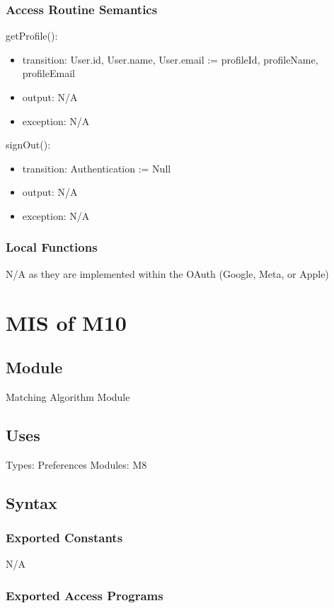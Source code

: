\documentclass[12pt, titlepage]{article}
\begin{document}
\subsubsection{Access Routine Semantics}

\noindent getProfile():
\begin{itemize}
\item transition: User.id, User.name, User.email := profileId, profileName, profileEmail
\item output: N/A
\item exception: N/A
\end{itemize}

\noindent signOut():
\begin{itemize}
\item transition: Authentication := Null
\item output: N/A
\item exception: N/A
\end{itemize}

\subsubsection{Local Functions}
N/A as they are implemented within the OAuth (Google, Meta, or Apple)


\section{MIS of M10} \label{Module}

\subsection{Module}
Matching Algorithm Module

\subsection{Uses}
Types: Preferences
Modules: M8

\subsection{Syntax}

\subsubsection{Exported Constants}
N/A

\subsubsection{Exported Access Programs}
\end{document}
